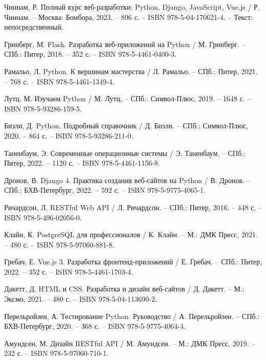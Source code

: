 
\begin{thebibliography}{9}
	
	 Чиннам, Р. Полный курс веб-разработки: Python, Django, JavaScript, Vue.js / Р. Чиннам. – Москва: Бомбора, 2023. – 896 с. – ISBN 978-5-04-170621-4. – Текст: непосредственный.
	
	 Гринберг, М. Flask. Разработка веб-приложений на Python / М. Гринберг. – СПб.: Питер, 2018. – 352 с. – ISBN 978-5-4461-0400-3.
	
	 Рамальо, Л. Python. К вершинам мастерства / Л. Рамальо. – СПб.: Питер, 2021. – 768 с. – ISBN 978-5-4461-1349-4.
	
	 Лутц, М. Изучаем Python / М. Лутц. – СПб.: Символ-Плюс, 2019. – 1648 с. – ISBN 978-5-93286-159-5.
	
	 Бизли, Д. Python. Подробный справочник / Д. Бизли. – СПб.: Символ-Плюс, 2020. – 864 с. – ISBN 978-5-93286-211-0.
	
	 Таненбаум, Э. Современные операционные системы / Э. Таненбаум. – СПб.: Питер, 2022. – 1120 с. – ISBN 978-5-4461-1156-8.
	
	 Дронов, В. Django 4. Практика создания веб-сайтов на Python / В. Дронов. – СПб.: БХВ-Петербург, 2022. – 592 с. – ISBN 978-5-9775-4065-1.
	
	 Ричардсон, Л. RESTful Web API / Л. Ричардсон. – СПб.: Питер, 2016. – 448 с. – ISBN 978-5-496-02056-0.
	
	 Клайн, К. PostgreSQL для профессионалов / К. Клайн. – М.: ДМК Пресс, 2021. – 480 с. – ISBN 978-5-97060-881-8.
	
	 Гребач, Е. Vue.js 3. Разработка фронтенд-приложений / Е. Гребач. – СПб.: Питер, 2022. – 352 с. – ISBN 978-5-4461-1703-4.
	
	 Дакетт, Д. HTML и CSS. Разработка и дизайн веб-сайтов / Д. Дакетт. – М.: Эксмо, 2021. – 480 с. – ISBN 978-5-04-113690-2.
	
	 Перельройзен, А. Тестирование Python. Руководство / А. Перельройзен. – СПб.: БХВ-Петербург, 2020. – 368 с. – ISBN 978-5-9775-4064-4.
	
	 Амундсен, М. Дизайн RESTful API / М. Амундсен. – М.: ДМК Пресс, 2019. – 232 с. – ISBN 978-5-97060-710-1.
	

\end{thebibliography}

